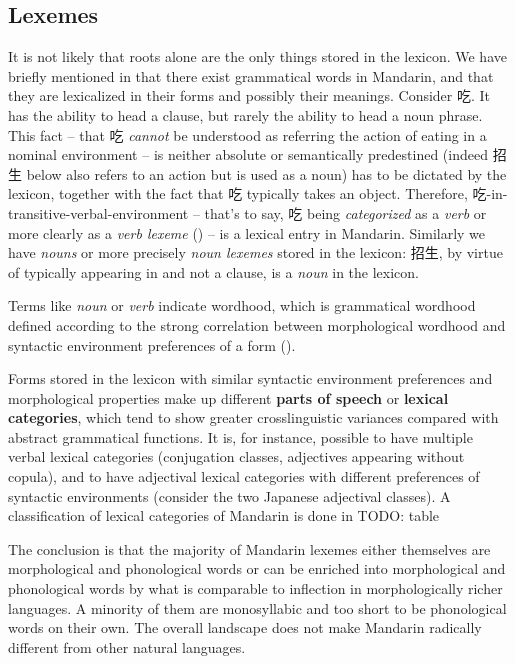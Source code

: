 \documentclass[UTF8, a4paper, oneside, scheme=plain, 12pt]{ctexrep}
\newcommand*{\concept}[1]{\textbf{#1}}
\newcommand*{\term}[1]{\emph{#1}}
\begin{document}
\subsection{Lexemes}\label{sec:grammatical.lexicon.words}

It is not likely that roots alone are the only things stored in the lexicon.
We have briefly mentioned in 
that there exist grammatical words in Mandarin,
and that they are lexicalized in their forms and possibly their meanings.
Consider 吃. It has the ability to head a clause,
but rarely the ability to head a noun phrase.
This fact -- that 吃 \emph{cannot} be understood as referring the action of eating in a nominal environment -- is neither absolute or semantically predestined
(indeed 招生 below also refers to an action but is used as a noun)
has to be dictated by the lexicon,
together with the fact that 吃 typically takes an object.
Therefore, 吃-in-transitive-verbal-environment -- that's to say, 吃 being \term{categorized} as a \term{verb} or more clearly as a \term{verb lexeme} () -- 
is a lexical entry in Mandarin.
Similarly we have \term{nouns} or more precisely \term{noun lexemes} stored in the lexicon:
招生, by virtue of typically appearing in 
and not a clause, is a \term{noun} in the lexicon.

Terms like \term{noun} or \term{verb} indicate wordhood,
which is grammatical wordhood defined according to the strong correlation
between morphological wordhood and syntactic environment preferences of a form
().

Forms stored in the lexicon with similar syntactic environment preferences and morphological properties
make up different \concept{parts of speech} or \concept{lexical categories},
which tend to show greater crosslinguistic variances compared with abstract grammatical functions.
It is, for instance, possible to have multiple verbal lexical categories
(conjugation classes, adjectives appearing without copula),
and to have adjectival lexical categories with different preferences of syntactic environments
(consider the two Japanese adjectival classes).
A classification of lexical categories of Mandarin is done in TODO: table

The conclusion is that the majority of Mandarin lexemes
either themselves are morphological and phonological words 
or can be enriched into morphological and phonological words
by what is comparable to inflection in morphologically richer languages.
A minority of them are monosyllabic and too short to be phonological words on their own.
The overall landscape does not make Mandarin radically different from other natural languages.
\end{document}
